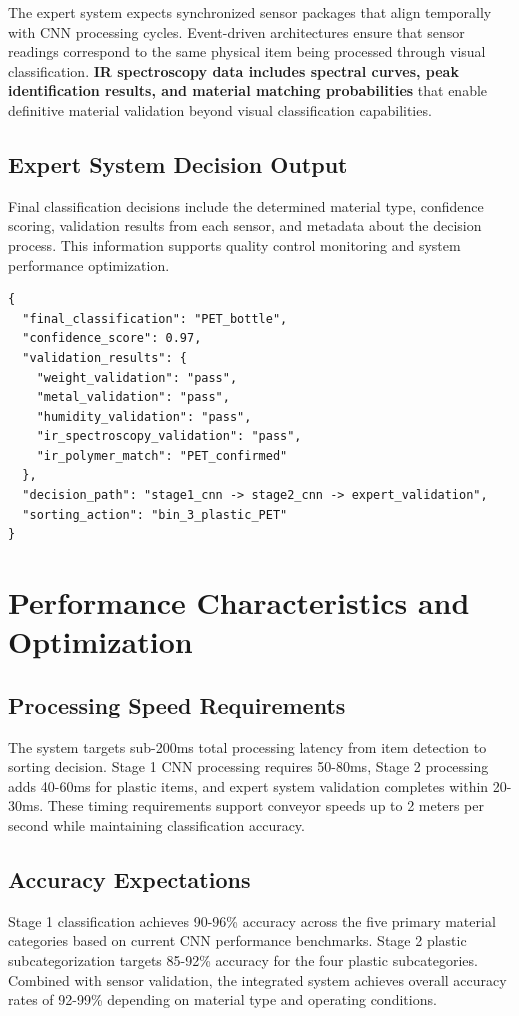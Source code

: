 \documentclass[11pt, a4paper]{article}
\begin{document}
The expert system expects synchronized sensor packages that align temporally with CNN processing cycles. Event-driven architectures ensure that sensor readings correspond to the same physical item being processed through visual classification. \textbf{IR spectroscopy data includes spectral curves, peak identification results, and material matching probabilities} that enable definitive material validation beyond visual classification capabilities.

\subsection{Expert System Decision Output}
Final classification decisions include the determined material type, confidence scoring, validation results from each sensor, and metadata about the decision process. This information supports quality control monitoring and system performance optimization.

\begin{lstlisting}[style=jsonstyle, caption=Example Expert System Output JSON]
{
  "final_classification": "PET_bottle",
  "confidence_score": 0.97,
  "validation_results": {
    "weight_validation": "pass",
    "metal_validation": "pass", 
    "humidity_validation": "pass",
    "ir_spectroscopy_validation": "pass",
    "ir_polymer_match": "PET_confirmed"
  },
  "decision_path": "stage1_cnn -> stage2_cnn -> expert_validation",
  "sorting_action": "bin_3_plastic_PET"
}
\end{lstlisting}

\section{Performance Characteristics and Optimization}

\subsection{Processing Speed Requirements}
The system targets sub-200ms total processing latency from item detection to sorting decision. Stage 1 CNN processing requires 50-80ms, Stage 2 processing adds 40-60ms for plastic items, and expert system validation completes within 20-30ms. These timing requirements support conveyor speeds up to 2 meters per second while maintaining classification accuracy.

\subsection{Accuracy Expectations}
Stage 1 classification achieves 90-96\% accuracy across the five primary material categories based on current CNN performance benchmarks. Stage 2 plastic subcategorization targets 85-92\% accuracy for the four plastic subcategories. Combined with sensor validation, the integrated system achieves overall accuracy rates of 92-99\% depending on material type and operating conditions.
\end{document}
